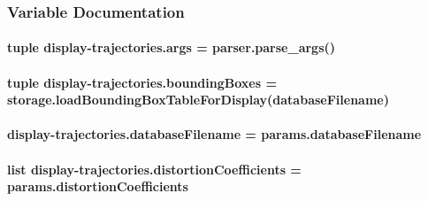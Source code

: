 \subsubsection{Variable Documentation}
\hypertarget{namespacedisplay-trajectories_aa96131c1a01682890e5a1d26bc810234}{
\paragraph[{args}]{\setlength{\rightskip}{0pt plus 5cm}tuple display-\/trajectories.\-args = parser.\-parse\-\_\-args()}}\label{namespacedisplay-trajectories_aa96131c1a01682890e5a1d26bc810234}
\hypertarget{namespacedisplay-trajectories_a006e51ba4b107177564f50f940d5f87d}{
\paragraph[{bounding\-Boxes}]{\setlength{\rightskip}{0pt plus 5cm}tuple display-\/trajectories.\-bounding\-Boxes = {\bf storage.\-load\-Bounding\-Box\-Table\-For\-Display}({\bf database\-Filename})}}\label{namespacedisplay-trajectories_a006e51ba4b107177564f50f940d5f87d}
\hypertarget{namespacedisplay-trajectories_a43b07df78fee39f08977f07a606d4b32}{
\paragraph[{database\-Filename}]{\setlength{\rightskip}{0pt plus 5cm}display-\/trajectories.\-database\-Filename = params.\-database\-Filename}}\label{namespacedisplay-trajectories_a43b07df78fee39f08977f07a606d4b32}
\hypertarget{namespacedisplay-trajectories_a4bc3c259d628ba2e71c96e346789824c}{
\paragraph[{distortion\-Coefficients}]{\setlength{\rightskip}{0pt plus 5cm}list display-\/trajectories.\-distortion\-Coefficients = params.\-distortion\-Coefficients}}\label{namespacedisplay-trajectories_a4bc3c259d628ba2e71c96e346789824c}
